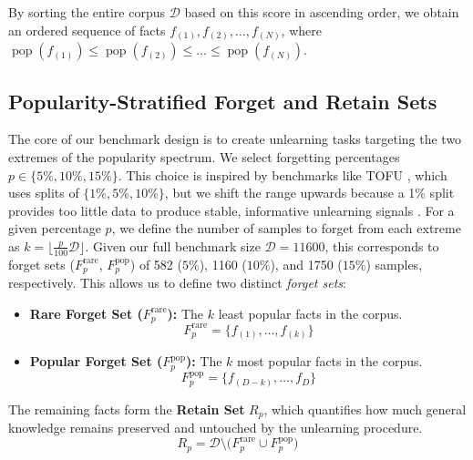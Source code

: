 \documentclass[11pt]{article}
\begin{document}
{By sorting the entire corpus $\mathcal{D}$ based on this score in ascending order, we obtain an ordered sequence of facts $f_{(1)}, f_{(2)}, \dots, f_{(N)}$, where $\operatorname{pop}(f_{(1)}) \le \operatorname{pop}(f_{(2)}) \le \dots \le \operatorname{pop}(f_{(N)})$.

\subsection{Popularity-Stratified Forget and Retain Sets}
\label{subsec:popular-strat}

The core of our benchmark design is to create unlearning tasks targeting the two extremes of the popularity spectrum. We select forgetting percentages \(p \in \{5\%,10\%,15\%\}\). This choice is inspired by benchmarks like TOFU \cite{maini2024tofu}, which uses splits of \(\{1\%,5\%,10\%\}\), but we shift the range upwards because a 1\% split provides too little data to produce stable, informative unlearning signals \cite{pal2025llm}. For a given percentage $p$, we define the number of samples to forget from each extreme as $k = \lfloor \frac{p}{100}\mathcal{D} \rfloor$. Given our full benchmark size \( \mathcal{D} = 11600 \), this corresponds to forget sets (\( F_p^{\text{rare}} \), \( F_p^{\text{pop}} \)) of 582 (\( 5\% \)), 1160 (\( 10\% \)), and 1750 (\( 15\% \)) samples, respectively.
This allows us to define two distinct \emph{forget sets}:
\begin{itemize}
    \item \textbf{Rare Forget Set ($F_p^{\text{rare}}$):} The $k$ least popular facts in the corpus.
    \begin{equation}
      F_p^{\text{rare}} = \{ f_{(1)}, \dots, f_{(k)} \}
    \end{equation}
    \item \textbf{Popular Forget Set ($F_p^{\text{pop}}$):} The $k$ most popular facts in the corpus.
    \begin{equation}
      F_p^{\text{pop}} = \{ f_{(D - k)}, \dots, f_{D} \}
    \end{equation}
\end{itemize}

The remaining facts form the \textbf{Retain Set} \(R_p\), which quantifies how much general knowledge remains preserved and untouched by the unlearning procedure.
\begin{equation}
  R_p = \mathcal{D} \setminus \bigl(F_p^{\text{rare}} \cup F_p^{\text{pop}}\bigr)
  \label{eq:retain-construction}
\end{equation}


}
\end{document}
